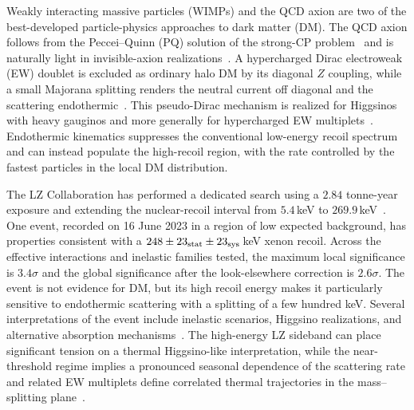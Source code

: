 \documentclass[aps,prd,reprint,preprintnumbers,superscriptaddress,nofootinbib,floatfix]{revtex4-2}
\begin{document}
Weakly interacting massive particles (WIMPs) and the QCD axion are two of the best-developed particle-physics approaches to dark matter (DM). The QCD axion follows from the Peccei--Quinn (PQ) solution of the strong-CP problem~\cite{Peccei:1977hh,Peccei:1977ur,Weinberg:1977ma,Wilczek:1977pj} and is naturally light in invisible-axion realizations~\cite{Kim:1979if, Shifman:1979if, Dine:1981rt, Zhitnitsky:1980tq}. A hypercharged Dirac electroweak (EW) doublet is excluded as ordinary halo DM by its diagonal $Z$ coupling, while a small Majorana splitting renders the neutral current off diagonal and the scattering endothermic~\cite{Tucker-Smith:2001myb, Tucker-Smith:2004mxa}. This pseudo-Dirac mechanism is realized for Higgsinos with heavy gauginos and more generally for hypercharged EW multiplets~\cite{Nagata:2014wma,Barello:2014uda,Bramante:2016rdh}. Endothermic kinematics suppresses the conventional low-energy recoil spectrum and can instead populate the high-recoil region, with the rate controlled by the fastest particles in the local DM distribution.

The LZ Collaboration has performed a dedicated search using a $2.84$ tonne-year exposure and extending the nuclear-recoil interval from $5.4$\,keV to $269.9$\,keV~\cite{LZ:2026axp}. One event, recorded on 16 June 2023 in a region of low expected background, has properties consistent with a $248\pm23_{\rm stat}\pm23_{\rm sys}$\,keV xenon recoil. Across the effective interactions and inelastic families tested, the maximum local significance is $3.4\sigma$ and the global significance after the look-elsewhere correction is $2.6\sigma$. The event is not evidence for DM, but its high recoil energy makes it particularly sensitive to endothermic scattering with a splitting of a few hundred keV. Several interpretations of the event include inelastic scenarios, Higgsino realizations, and alternative absorption mechanisms~\cite{Su:2026rwz, Fan:2026kxx,Freese:2026sga,Wu:2026nhi,Lou:2026idn,DiMauro:2026ldr,Pospelov:2026ewn,Yin:2026jnn, Chattopadhyay:2026ryw}. The high-energy LZ sideband can place significant tension on a thermal Higgsino-like interpretation, while the near-threshold regime implies a pronounced seasonal dependence of the scattering rate and related EW multiplets define correlated thermal trajectories in the mass--splitting plane~\cite{Rodd:2026tyn,McCabe:2026crm,Smirnov:2026aqk}.
\end{document}
